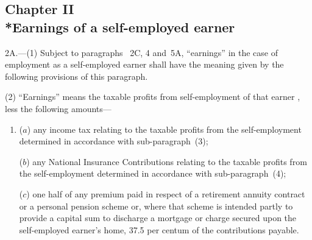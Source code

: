 \documentclass[12pt,a4paper]{article}
\begin{document}
\subsection[Chapter II --- Earnings of a self-employed earner]{Chapter II\\*Earnings of a self-employed earner}

\renewcommand\parthead{--- Schedule 1 Part I Chapter II}

2A.—(1) Subject to paragraphs~
2C, 4 and~5A, “earnings” in the case of employment as a self-employed earner shall have the meaning given by the following provisions of this paragraph.

(2) “Earnings” means the 
taxable profits from self-employment of that earner%
, less the following amounts—
\begin{enumerate}\item[]
($a$) any income tax relating to the taxable profits from the self-employment determined in accordance with sub-paragraph~(3);

($b$) any National Insurance Contributions relating to the taxable profits from the self-employment determined in accordance with sub-paragraph~(4);

($c$) one half of any premium paid in respect of a retirement annuity contract or a personal pension scheme or, where that scheme is intended partly to provide a capital sum to discharge a mortgage or charge secured upon the self-employed earner’s home, 37$.$5 per centum of the contributions payable.
\end{enumerate}
\end{document}
